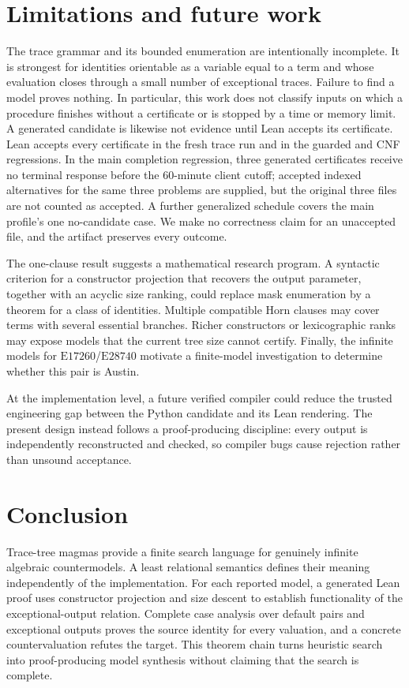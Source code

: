 \documentclass[runningheads]{llncs}
\newcommand{\Law}[1]{\ensuremath{\mathrm{E}#1}}
\begin{document}
\section{Limitations and future work}

The trace grammar and its bounded enumeration are intentionally incomplete.  It is strongest for identities
orientable as a variable equal to a term and whose evaluation closes through a
small number of exceptional traces.  Failure to find a model proves nothing.
In particular, this work does not classify inputs on which a procedure finishes
without a certificate or is stopped by a time or memory limit.  A generated
candidate is likewise not evidence until Lean accepts its certificate.  Lean
accepts every certificate in the fresh trace run and in the guarded and CNF
regressions.  In the main completion regression, three generated certificates
receive no terminal response before the 60-minute client cutoff; accepted
indexed alternatives for the same three problems are supplied, but the original
three files are not counted as accepted.  A further generalized schedule covers
the main profile's one no-candidate case.  We make no correctness claim for an
unaccepted file, and the artifact preserves every outcome.

The one-clause result suggests a mathematical research program.  A syntactic
criterion for a constructor projection that recovers the output parameter,
together with an acyclic size ranking, could
replace mask enumeration by a theorem for a class of identities.  Multiple
compatible Horn clauses may cover terms with several essential branches.
Richer constructors or lexicographic ranks may expose models that the current
tree size cannot certify.  Finally, the infinite models for
\Law{17260}/\Law{28740} motivate a finite-model investigation to determine
whether this pair is Austin.

At the implementation level, a future verified compiler could reduce the
trusted engineering gap between the Python candidate and its Lean rendering.
The present design instead follows a proof-producing discipline: every output
is independently reconstructed and checked, so compiler bugs cause rejection
rather than unsound acceptance.

\section{Conclusion}

Trace-tree magmas provide a finite search language for genuinely infinite
algebraic countermodels.  A least relational semantics defines their meaning
independently of the implementation.  For each reported model, a generated
Lean proof uses constructor projection and size descent to establish
functionality of the exceptional-output relation.  Complete case analysis over
default pairs and exceptional outputs proves the source identity for every
valuation, and a concrete countervaluation refutes the target.  This theorem
chain turns heuristic search into proof-producing model synthesis without
claiming that the search is complete.
\end{document}
